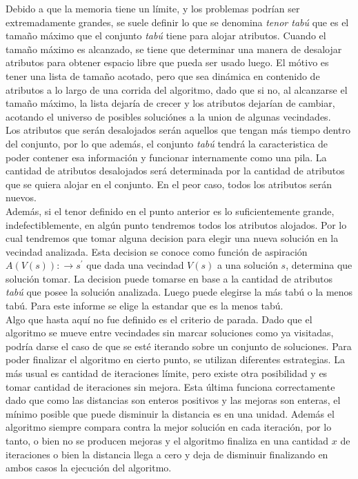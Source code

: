 Debido a que la memoria tiene un límite, y los problemas podrían ser extremadamente grandes, se suele definir lo que se denomina \textit{tenor tabú} que es el tamaño máximo que el conjunto \textit{tabú} tiene para alojar atributos. Cuando el tamaño máximo es alcanzado, se tiene que determinar una manera de desalojar atributos para obtener espacio libre que pueda ser usado luego. El mótivo es tener una lista de tamaño acotado, pero que sea dinámica en contenido de atributos a lo largo de una corrida del algoritmo, dado que si no, al alcanzarse el tamaño máximo, la lista dejaría de crecer y los atributos dejarían de cambiar, acotando el universo de posibles soluciónes a la union de algunas vecindades.\\
Los atributos que serán desalojados serán aquellos que tengan más tiempo dentro del conjunto, por lo que además, el conjunto \textit{tabú} tendrá la caracteristica de poder contener esa información y funcionar internamente como una pila. 
La cantidad de atributos desalojados será determinada por la cantidad de atributos que se quiera alojar en el conjunto. En el peor caso, todos los atributos serán nuevos.\\

Además, si el tenor definido en el punto anterior es lo suficientemente grande, indefectiblemente, en algún punto tendremos todos los atributos alojados. Por lo cual tendremos que tomar alguna decision para elegir una nueva solución en la vecindad analizada. Esta decision se conoce como función de aspiración $A(V(s)): \rightarrow s^{'}$ que dada una vecindad $V(s)$ a una solución $s$, determina que solución tomar.
La decision puede tomarse en base a la cantidad de atributos \textit{tabú} que posee la solución analizada. Luego puede elegirse la más tabú o la menos tabú. Para este informe se elige la estandar que es la menos tabú.\\

Algo que hasta aquí no fue definido es el criterio de parada. Dado que el algoritmo se mueve entre vecindades sin marcar soluciones como ya visitadas, podría darse el caso de que se esté iterando sobre un conjunto de soluciones. Para poder finalizar el algoritmo en cierto punto, se utilizan diferentes estrategias. La más usual es cantidad de iteraciones límite, pero existe otra posibilidad y es tomar cantidad de iteraciones sin mejora. Esta última funciona correctamente dado que como las distancias son enteros positivos y las mejoras son enteras, el mínimo posible que puede disminuir la distancia es en una unidad. Además el algoritmo siempre compara contra la mejor solución en cada iteración, por lo tanto, o bien no se producen mejoras y el algoritmo finaliza en una cantidad $x$ de iteraciones o bien la distancia llega a cero y deja de disminuir finalizando en ambos casos la ejecución del algoritmo.\\

